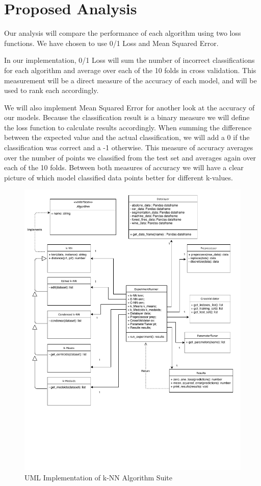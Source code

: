\documentclass[twoside,11pt]{article}
\begin{document}
\section{Proposed Analysis}
    Our analysis will compare the performance of each algorithm using two loss functions. We have chosen to use 0/1 Loss and Mean Squared Error.
    
    In our implementation, 0/1 Loss will sum the number of incorrect classifications for each algorithm and average over each of the 10 folds in cross validation. This measurement will be a direct measure of the accuracy of each model, and will be used to rank each accordingly.
    
    We will also implement Mean Squared Error for another look at the accuracy of our models. Because the classification result is a binary measure we will define the loss function to calculate results accordingly. When summing the difference between the expected value and the actual classification, we will add a 0 if the classification was correct and a -1 otherwise. This measure of accuracy averages over the number of points we classified from the test set and averages again over each of the 10 folds. Between both measures of accuracy we will have a clear picture of which model classified data points better for different k-values.

\newpage



\begin{figure}
    \centering
    \includegraphics[width=1\textwidth]{ML_Project2_UML.pdf}
    \caption{UML Implementation of k-NN Algorithm Suite}
    \label{fig:my_label}
\end{figure}
\end{document}
